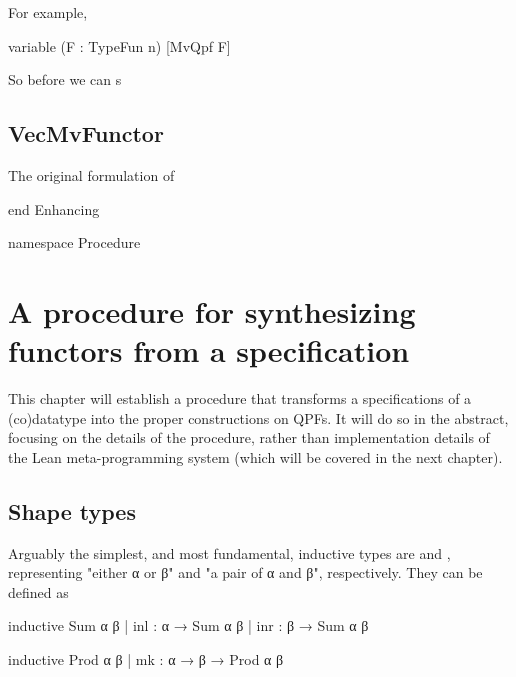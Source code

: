 \documentclass[titlepage]{report}
\newenvironment{leanhidden}{\expandafter\comment}{\expandafter\endcomment}
\begin{document}
For example, 
\begin{leancode}
    variable (F : TypeFun n) [MvQpf F]
\end{leancode}

So before we can s



\section{VecMvFunctor}

The original formulation of 







\begin{leanhidden}
    end Enhancing

    namespace Procedure
\end{leanhidden}




\chapter{A procedure for synthesizing functors from a specification}
\label{ch:procedure}

This chapter will establish a procedure that transforms a specifications of a (co)datatype
into the proper constructions on QPFs.
It will do so in the abstract, focusing on the details of the procedure, rather than implementation
details of the Lean meta-programming system (which will be covered in the next chapter).


\section{Shape types}

Arguably the simplest, and most fundamental, inductive types are  and ,
representing "either α or β" and "a pair of α and β", respectively.
They can be defined as

\begin{center}
\begin{minipage}[t]{0.45\linewidth}
    \begin{leancode}
inductive Sum α β
  | inl : α → Sum α β
  | inr : β → Sum α β
    \end{leancode}
\end{minipage}
\begin{minipage}[t]{0.45\linewidth}
    \begin{leancode}    
inductive Prod α β
  | mk : α → β → Prod α β
    \end{leancode}
\end{minipage}
\end{center}
\end{document}
